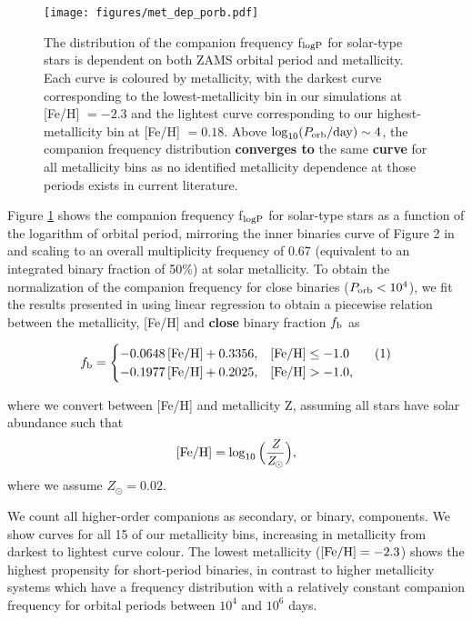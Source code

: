 \documentclass[twocolumn, linenumbers]{aastex631}
\newcommand\numberthis{\addtocounter{equation}{1}\tag{\theequation}}
\begin{document}
\begin{figure}
	\texttt{[image: figures/met\_dep\_porb.pdf]}
    \caption{The distribution of the companion frequency f$_{\rm{logP}}$ for solar-type stars is dependent on both ZAMS orbital period and metallicity. Each curve is coloured by metallicity, with the darkest curve corresponding to the lowest-metallicity bin in our simulations at [Fe/H] $=-2.3$ and the lightest curve corresponding to our highest-metallicity bin at [Fe/H] $=0.18$. Above $\log_{10}(P_{\rm{orb}}/\rm{day})\sim 4$, the companion frequency distribution \textbf{converges to} the same \textbf{curve} for all metallicity bins as no identified metallicity dependence at those periods exists in current literature.}
    \label{fig:met_dep_porb}
\end{figure}

Figure \ref{fig:met_dep_porb} shows the companion frequency f$_{\rm{logP}}$ for solar-type stars as a function of the logarithm of orbital period, mirroring the inner binaries curve of Figure 2 in \citet{Moe2021} and scaling to an overall multiplicity frequency of 0.67 (equivalent to an integrated binary fraction of 50\%) at solar metallicity. To obtain the normalization of the companion frequency for close binaries ($P_{\rm{orb}}<10^4$), we fit the results presented in \citet{Moe2019} using linear regression to obtain a piecewise relation between the metallicity, [Fe/H] and \textbf{close} binary fraction $f_{\rm{b}}$ as

\[f_{\rm{b}}= \begin{cases} 
      - 0.0648 \, \rm{ [Fe/H]} + 0.3356, & [\rm{Fe/H}]\leq -1.0 \numberthis \\
     -0.1977 \, \rm{ [Fe/H]} + 0.2025, & [\rm{Fe/H}]> -1.0  , 
   \end{cases}
\]

\noindent where we convert between [Fe/H] and metallicity Z, assuming all stars have solar abundance such that
\begin{equation}
\label{eq:metallicity}
    [\rm{Fe/H}] = \log_{10}\Big(\frac{\textit{Z}}{\textit{Z}_{\odot}}\Big),
\end{equation}
\noindent where we assume $Z_{\odot}=0.02$.

We count all higher-order companions as secondary, or binary, components. We show curves for all 15 of our metallicity bins, increasing in metallicity from darkest to lightest curve colour. The lowest metallicity ($\rm{[Fe/H]}=-2.3$) shows the highest propensity for short-period binaries, in contrast to higher metallicity systems which have a frequency distribution with a relatively constant companion frequency for orbital periods between $10^4$ and $10^6$ days.
\end{document}
